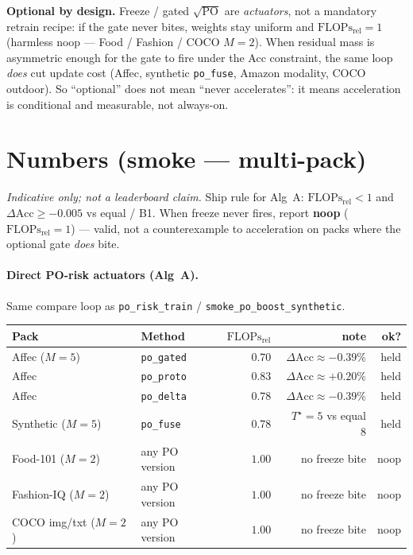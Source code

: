 \documentclass[11pt]{article}
\newcommand{\PO}{\mathrm{PO}}
\newcommand{\Acc}{\mathrm{Acc}}
\newcommand{\Flops}{\mathrm{FLOPs}_{\mathrm{rel}}}
\begin{document}
\noindent\textbf{Optional by design.}
Freeze / gated $\sqrt{\PO}$ are \emph{actuators}, not a mandatory
retrain recipe: if the gate never bites, weights stay uniform and
$\Flops{=}1$ (harmless noop --- Food / Fashion / COCO $M{=}2$).
When residual mass is asymmetric enough for the gate to fire under
the Acc constraint, the same loop \emph{does} cut update cost
(Affec, synthetic \texttt{po\_fuse}, Amazon modality, COCO outdoor).
So ``optional'' does not mean ``never accelerates'': it means
acceleration is conditional and measurable, not always-on.

\section{Numbers (smoke --- multi-pack)}
\textit{Indicative only; not a leaderboard claim.}
Ship rule for Alg~A: $\Flops<1$ and $\Delta\Acc\ge-0.005$
vs equal / B1. When freeze never fires, report \textbf{noop}
($\Flops{=}1$) --- valid, not a counterexample to acceleration
on packs where the optional gate \emph{does} bite.

\paragraph{Direct PO-risk actuators (Alg~A).}
Same compare loop as \texttt{po\_risk\_train} /
\texttt{smoke\_po\_boost\_synthetic}.
\begin{center}
\small
\begin{tabular}{@{}llrrr@{}}
\toprule
Pack & Method & $\Flops$ & note & ok? \\
\midrule
Affec ($M{=}5$)
  & \texttt{po\_gated}
  & $0.70$ & $\Delta\Acc\approx-0.39\%$ & held \\
Affec
  & \texttt{po\_proto}
  & $0.83$ & $\Delta\Acc\approx+0.20\%$ & held \\
Affec
  & \texttt{po\_delta}
  & $0.78$ & $\Delta\Acc\approx-0.39\%$ & held \\
Synthetic ($M{=}5$)
  & \texttt{po\_fuse}
  & $0.78$ & $T^\star{=}5$ vs equal $8$ & held \\
Food-101 ($M{=}2$)
  & any PO version
  & $1.00$ & no freeze bite & noop \\
Fashion-IQ ($M{=}2$)
  & any PO version
  & $1.00$ & no freeze bite & noop \\
COCO img/txt ($M{=}2$)
  & any PO version
  & $1.00$ & no freeze bite & noop \\
\bottomrule
\end{tabular}
\end{center}
\end{document}
